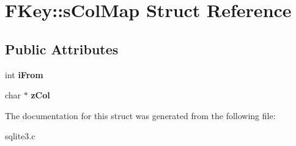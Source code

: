 \hypertarget{struct_f_key_1_1s_col_map}{\section{F\-Key\-:\-:s\-Col\-Map Struct Reference}
\label{struct_f_key_1_1s_col_map}
}
\subsection*{Public Attributes}
\begin{DoxyCompactItemize}
\item 
\hypertarget{struct_f_key_1_1s_col_map_a2b0ed19d4924a93d1f3f14f891b176ed}{int {\bfseries i\-From}}\label{struct_f_key_1_1s_col_map_a2b0ed19d4924a93d1f3f14f891b176ed}

\item 
\hypertarget{struct_f_key_1_1s_col_map_a4cdef475be73cc460873051a2c2c2937}{char $\ast$ {\bfseries z\-Col}}\label{struct_f_key_1_1s_col_map_a4cdef475be73cc460873051a2c2c2937}

\end{DoxyCompactItemize}


The documentation for this struct was generated from the following file\-:\begin{DoxyCompactItemize}
\item 
sqlite3.\-c\end{DoxyCompactItemize}
